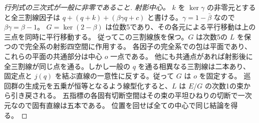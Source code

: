 \begin{proof}[行列式の三次式が一般に非零であること]
\smallskip
\noindent\textit{射影中心。}
$k$ を $\ker\gamma$ の非零元とすると全三割線因子は
$q+(q+k)+(\beta\gamma q+c)$ と書ける。$\gamma=1-\bar\beta$ なので $\beta\gamma=\beta-1$。
$G=\ker(2-\beta)$ は位数5であり、その各元による平行移動は上の三点を同時に平行移動する。
従ってこの三割線族を保つ。$G$ は次数5の $L$ を保つので完全系の射影四空間に作用する。
各因子の完全系での包は平面であり、これらの平面の共通部分は中心 $o$ 一点である。
他にも共通点があれば射影後に全三割線が同じ点を通る。しかし一般の $q$ を通る相異なる三割線は二本あり、
固定点と $j(q)$ を結ぶ直線の一意性に反する。従って $G$ は $o$ を固定する。
巡回群の生成元を五乗が恒等となるよう線型化すると、$L$ は $E/G$ の次数1の束から引き戻される。
五指標の各固有切断空間はその束の平坦ひねりの切断で一次元なので固有直線は五本である。
位置を回せば全ての中心で同じ結論を得る。
\end{proof}

